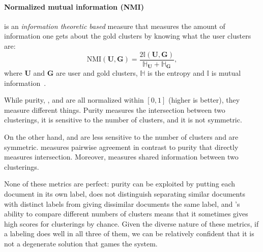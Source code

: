 \paragraph{Normalized mutual information (NMI)}
 is an \emph{information theoretic based} measure that
measures the amount of information one gets about the gold clusters by
knowing what the user clusters are:
\begin{equation}
\label{eq:nmi}
	\mbox{NMI}(\mathbf{U},\mathbf{G})= \frac{2\mathbb{I}(\mathbf{U},\mathbf{G})}{\mathbb{H}_{\mathbf{U}}+\mathbb{H}_{\mathbf{G}}},
\end{equation}
where $\mathbf{U}$ and $\mathbf{G}$ are user and gold clusters,
$\mathbb{H}$ is the entropy and $\mathbb{I}$ is mutual
information~\cite{bouma-09}.


While purity, , and  are all normalized within $[0,1]$
(higher is better), they measure different things.  Purity measures
the intersection between two clusterings, it is sensitive to the
number of clusters, and it is not symmetric. 
  
  On the other hand,  and
 are less sensitive to the number of clusters and are
symmetric.  measures pairwise agreement in contrast to purity
that directly measures intersection. Moreover,  measures
shared information between two clusterings.

None of these metrics are perfect: purity can be exploited by putting
each document in its own label,  does not distinguish
separating similar documents with distinct labels from giving dissimilar documents
the same label, and 's ability to compare different numbers of clusters
means that it sometimes gives high scores for clusterings by
chance. Given the diverse nature of these metrics, if a labeling does
well in all three of them, we can be relatively confident that it is not
a degenerate solution that games the system.








